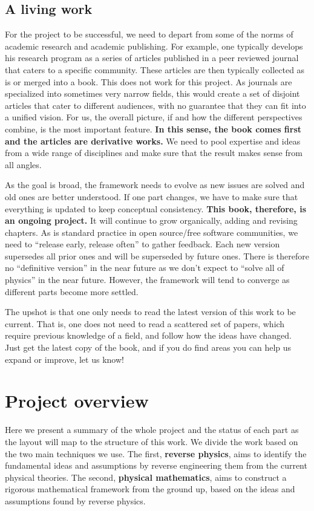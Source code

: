 \documentclass[11pt,letterpaper,fleqn]{memoir} %
\begin{document}
\subsection{A living work}

For the project to be successful, we need to depart from some of the norms of academic research and academic publishing. For example, one typically develops his research program as a series of articles published in a peer reviewed journal that caters to a specific community. These articles are then typically collected as is or merged into a book. This does not work for this project. As journals are specialized into sometimes very narrow fields, this would create a set of disjoint articles that cater to different audiences, with no guarantee that they can fit into a unified vision. For us, the overall picture, if and how the different perspectives combine, is the most important feature. \textbf{In this sense, the book comes first and the articles are derivative works.} We need to pool expertise and ideas from a wide range of disciplines and make sure that the result makes sense from all angles.

As the goal is broad, the framework needs to evolve as new issues are solved and old ones are better understood. If one part changes, we have to make sure that everything is updated to keep conceptual consistency. \textbf{This book, therefore, is an ongoing project.} It will continue to grow organically, adding and revising chapters. As is standard practice in open source/free software communities, we need to ``release early, release often'' to gather feedback. Each new version supersedes all prior ones and will be superseded by future ones. There is therefore no ``definitive version'' in the near future as we don't expect to ``solve all of physics'' in the near future. However, the framework will tend to converge as different parts become more settled.

The upshot is that one only needs to read the latest version of this work to be current. That is, one does not need to read a scattered set of papers, which require previous knowledge of a field, and follow how the ideas have changed. Just get the latest copy of the book, and if you do find areas you can help us expand or improve, let us know!

\section{Project overview}

Here we present a summary of the whole project and the status of each part as the layout will map to the structure of this work. We divide the work based on the two main techniques we use. The first, \textbf{reverse physics}, aims to identify the fundamental ideas and assumptions by reverse engineering them from the current physical theories. The second, \textbf{physical mathematics}, aims to construct a rigorous mathematical framework from the ground up, based on the ideas and assumptions found by reverse physics.
\end{document}
